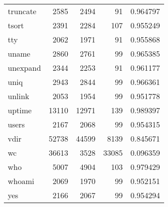 \begin{longtable}{lrrrr}
truncate  &                     2585 &         2494 &            91 &                 0.964797 \\
tsort     &                     2391 &         2284 &           107 &                 0.955249 \\
tty       &                     2062 &         1971 &            91 &                 0.955868 \\
uname     &                     2860 &         2761 &            99 &                 0.965385 \\
unexpand  &                     2344 &         2253 &            91 &                 0.961177 \\
uniq      &                     2943 &         2844 &            99 &                 0.966361 \\
unlink    &                     2053 &         1954 &            99 &                 0.951778 \\
uptime    &                    13110 &        12971 &           139 &                 0.989397 \\
users     &                     2167 &         2068 &            99 &                 0.954315 \\
vdir      &                    52738 &        44599 &          8139 &                 0.845671 \\
wc        &                    36613 &         3528 &         33085 &                 0.096359 \\
who       &                     5007 &         4904 &           103 &                 0.979429 \\
whoami    &                     2069 &         1970 &            99 &                 0.952151 \\
yes       &                     2166 &         2067 &            99 &                 0.954294 \\
\end{longtable}
